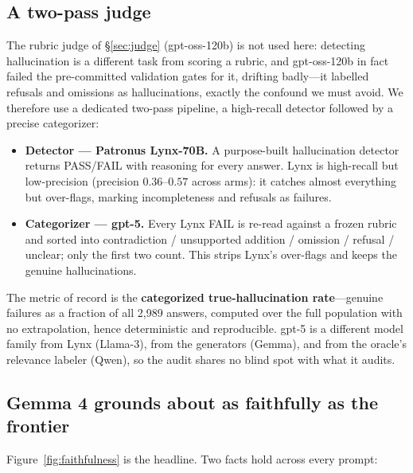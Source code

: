 \subsection{A two-pass judge}
\label{sec:faith-judge}

The rubric judge of \S\ref{sec:judge} (gpt-oss-120b) is not used here:
detecting hallucination is a different task from scoring a rubric, and
gpt-oss-120b in fact failed the pre-committed validation gates for it,
drifting badly---it labelled refusals and omissions as hallucinations, exactly
the confound we must avoid. We therefore use a dedicated two-pass pipeline,
a high-recall detector followed by a precise categorizer:
\begin{itemize}\setlength{\itemsep}{1pt}
  \item \textbf{Detector --- Patronus Lynx-70B.} A purpose-built hallucination
  detector returns PASS/FAIL with reasoning for every answer. Lynx is
  high-recall but low-precision (precision $0.36$--$0.57$ across arms): it
  catches almost everything but over-flags, marking incompleteness and
  refusals as failures.
  \item \textbf{Categorizer --- gpt-5.} Every Lynx FAIL is re-read against a
  frozen rubric and sorted into contradiction / unsupported addition /
  omission / refusal / unclear; only the first two count. This strips Lynx's
  over-flags and keeps the genuine hallucinations.
\end{itemize}
The metric of record is the \textbf{categorized true-hallucination
rate}---genuine failures as a fraction of all 2{,}989 answers, computed over
the full population with no extrapolation, hence deterministic and
reproducible. gpt-5 is a different model family from Lynx (Llama-3), from the
generators (Gemma), and from the oracle's relevance labeler (Qwen), so the
audit shares no blind spot with what it audits.

\subsection{Gemma 4 grounds about as faithfully as the frontier}
\label{sec:faith-results}

Figure~\ref{fig:faithfulness} is the headline. Two facts hold across every
prompt:


